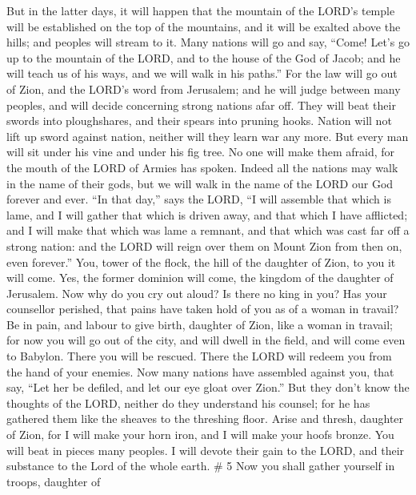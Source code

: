  But in the latter days, it will happen that the mountain of
the LORD's temple will be established on the top of the mountains, and
it will be exalted above the hills; and peoples will stream to it.
 Many nations will go and say, ``Come! Let's go up to the
mountain of the LORD, and to the house of the God of Jacob; and he will
teach us of his ways, and we will walk in his paths.'' For the law will
go out of Zion, and the LORD's word from Jerusalem;  and he
will judge between many peoples, and will decide concerning strong
nations afar off. They will beat their swords into ploughshares, and
their spears into pruning hooks. Nation will not lift up sword against
nation, neither will they learn war any more.  But every man
will sit under his vine and under his fig tree. No one will make them
afraid, for the mouth of the LORD of Armies has spoken. 
Indeed all the nations may walk in the name of their gods, but we will
walk in the name of the LORD our God forever and ever.  ``In
that day,'' says the LORD, ``I will assemble that which is lame, and I
will gather that which is driven away, and that which I have afflicted;
 and I will make that which was lame a remnant, and that
which was cast far off a strong nation: and the LORD will reign over
them on Mount Zion from then on, even forever.''  You, tower
of the flock, the hill of the daughter of Zion, to you it will come.
Yes, the former dominion will come, the kingdom of the daughter of
Jerusalem.  Now why do you cry out aloud? Is there no king
in you? Has your counsellor perished, that pains have taken hold of you
as of a woman in travail?  Be in pain, and labour to give
birth, daughter of Zion, like a woman in travail; for now you will go
out of the city, and will dwell in the field, and will come even to
Babylon. There you will be rescued. There the LORD will redeem you from
the hand of your enemies.  Now many nations have assembled
against you, that say, ``Let her be defiled, and let our eye gloat over
Zion.''  But they don't know the thoughts of the LORD,
neither do they understand his counsel; for he has gathered them like
the sheaves to the threshing floor.  Arise and thresh,
daughter of Zion, for I will make your horn iron, and I will make your
hoofs bronze. You will beat in pieces many peoples. I will devote their
gain to the LORD, and their substance to the Lord of the whole earth. \#
5  Now you shall gather yourself in troops, daughter of
